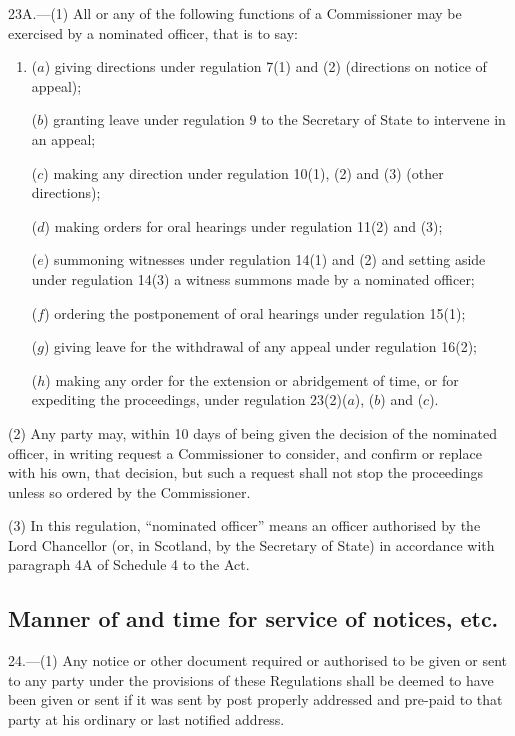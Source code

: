 \documentclass[12pt,a4paper]{article}
\begin{document}
23A.—(1) All or any of the following functions of a Commissioner may be exercised by a nominated officer, that is to say:
\begin{enumerate}\item[]
($a$) giving directions under regulation 7(1) and (2) (directions on notice of appeal);

($b$) granting leave under regulation 9 to the Secretary of State to intervene in an appeal;

($c$) making any direction under regulation 10(1), (2) and (3) (other directions);

($d$) making orders for oral hearings under regulation 11(2) and (3);

($e$) summoning witnesses under regulation 14(1) and (2) and setting aside under regulation 14(3) a witness summons made by a nominated officer;

($f$) ordering the postponement of oral hearings under regulation 15(1);

($g$) giving leave for the withdrawal of any appeal under regulation 16(2);

($h$) making any order for the extension or abridgement of time, or for expediting the proceedings, under regulation 23(2)($a$), ($b$) and ($c$).
\end{enumerate}

(2) Any party may, within 10 days of being given the decision of the nominated officer, in writing request a Commissioner to consider, and confirm or replace with his own, that decision, but such a request shall not stop the proceedings unless so ordered by the Commissioner.

(3) In this regulation, “nominated officer” means an officer authorised by the Lord Chancellor (or, in Scotland, by the Secretary of State) in accordance with paragraph 4A of Schedule 4 to the Act.


\subsection[24. Manner of and time for service of notices, etc.]{Manner of and time for service of notices, etc.}

24.—(1) Any notice or other document required or authorised to be given or sent to any party under the provisions of these Regulations shall be deemed to have been given or sent if it was sent by post properly addressed and pre-paid to that party at his ordinary or last notified address.
\end{document}
